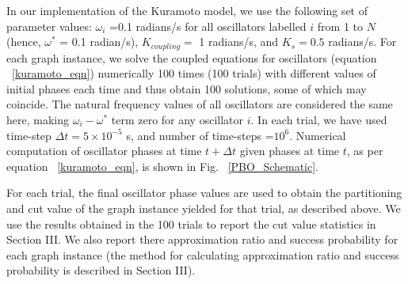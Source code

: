 \documentclass[%
 reprint,
 amsmath,amssymb,
 aps,
]{revtex4-2}
\begin{document}





In our implementation of the Kuramoto model, we use the following set of parameter values: $\omega_i$ =0.1 radians/s for all oscillators labelled $i$ from 1 to $N$ (hence, $\omega^{*}$ = 0.1 radian/s),
$K_{coupling}=$ 1 radians/s, and $K_{s}=0.5$ radians/s. For each graph instance, we solve the coupled equations for oscillators (equation ~\ref{kuramoto_eqn}) numerically 100 times (100 trials) with different values of initial phases each time and thus obtain 100 solutions, some of which may coincide. The natural frequency values of all  oscillators  are considered the same here, making  $\omega _{i}-\omega^{*}$ term zero for any oscillator $i$. In each trial, we have used time-step $\Delta t=5 \times 10^{-5}$ s, and number of time-steps =$10^{6}$. Numerical computation of oscillator phases at time $t+\Delta t$ given phases at time $t$, as per equation ~\ref{kuramoto_eqn}, is shown in Fig. ~\ref{PBO_Schematic}.


For each trial, the final oscillator phase values are used to obtain the partitioning and cut value of the graph instance yielded for that trial, as described above. We use the results obtained in the 100 trials to report the cut value statistics in Section III. We also report there approximation ratio and success probability for each graph instance (the method for calculating approximation ratio 
and success probability is described in Section III).





\end{document}
